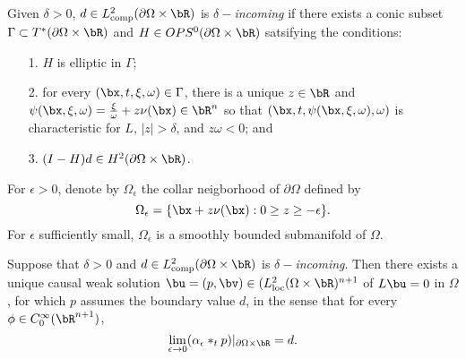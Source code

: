 \begin{definition}
  \label{thm:definc}
  Given $\delta >0$, $d \in L^2_{\rm comp}(\partial \Omega \times \bR)$ is $\delta-${\em incoming} if there exists a conic subset $\Gamma \subset T^*(\partial \Omega \times \bR)$ and $H \in OPS^0(\partial \Omega \times \bR)$ satsifying the conditions:
  \begin{itemize}
  \item[1. ] $H$ is elliptic in $\Gamma$;
  \item[2. ] for every $(\bx,t,\xi,\omega) \in \Gamma$, there is a
    unique $z \in \bR$ and $\psi(\bx,{\bf \xi},\omega) = \frac{{\bf \xi}}{\omega} + z {\bf \nu}(\bx)  \in
    \bR^n$ so that $(\bx,t,\psi(\bx,{\bf \xi},\omega),\omega)$ is
    characteristic for $L$, $|z| > \delta$, and $z\omega < 0$; and
  \item[3. ] $(I-H)d \in H^2(\partial \Omega \times \bR)$.
  \end{itemize}
\end{definition}

For $\epsilon > 0$, denote by $\Omega_{\epsilon}$ the collar neigborhood of $\partial \Omega$ defined by
\begin{equation}
  \label{eqn:collar}
  \Omega_{\epsilon} = \{\bx + z {\bf \nu}(\bx): 0 \ge z \ge  -\epsilon\}.
\end{equation}
For $\epsilon$ sufficiently small, $\Omega_{\epsilon}$ is a smoothly bounded submanifold of $\Omega$.

\begin{theorem}
  \label{thm:dirprob}
  Suppose that $\delta>0$ and $d \in L^2_{\rm comp}(\partial \Omega
  \times \bR)$ is $\delta-${\em incoming}. Then there exists a unique
  causal weak solution $\bu = (p,\bv) \in (L^2_{\rm loc}(\Omega \times
  \bR)^{n+1}$ of $L\bu=0$ in $\Omega$, for which $p$ assumes the boundary value $d$, in the sense that for every $\phi \in C_0^{\infty}(\bR^{n+1})$,
  \begin{equation}
    \label{eqn:weakbdry}
    \lim_{\epsilon \rightarrow 0}(\alpha_{\epsilon} *_t p)|_{\partial
      \Omega \times \bR}  = d.
  \end{equation}
\end{theorem}

